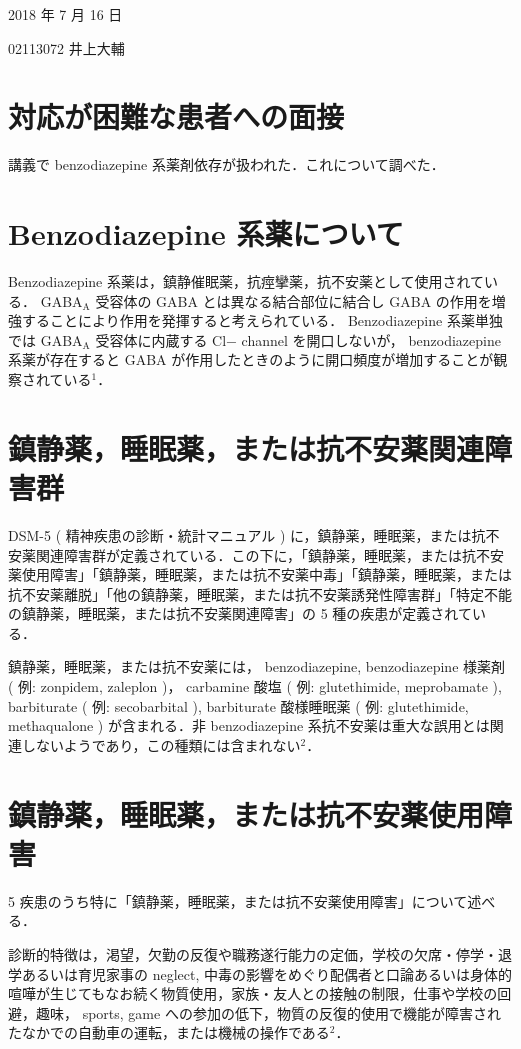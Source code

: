 \documentclass[11pt,dvipdfmx,uplatex]{jsarticle}
\begin{document}
2018 年 7 月 16 日

02113072 井上大輔
\section*{対応が困難な患者への面接}

講義で benzodiazepine 系薬剤依存が扱われた．これについて調べた．

\section{Benzodiazepine 系薬について}

Benzodiazepine 系薬は，鎮静催眠薬，抗痙攣薬，抗不安薬として使用されている． GABA$_\textrm{A}$ 受容体の GABA とは異なる結合部位に結合し GABA の作用を増強することにより作用を発揮すると考えられている． Benzodiazepine 系薬単独では GABA$_\textrm{A}$ 受容体に内蔵する Cl$-$ channel を開口しないが， benzodiazepine 系薬が存在すると GABA が作用したときのように開口頻度が増加することが観察されている$^1$．

\section{鎮静薬，睡眠薬，または抗不安薬関連障害群}

DSM-5 ( 精神疾患の診断・統計マニュアル ) に，鎮静薬，睡眠薬，または抗不安薬関連障害群が定義されている．この下に，「鎮静薬，睡眠薬，または抗不安薬使用障害」「鎮静薬，睡眠薬，または抗不安薬中毒」「鎮静薬，睡眠薬，または抗不安薬離脱」「他の鎮静薬，睡眠薬，または抗不安薬誘発性障害群」「特定不能の鎮静薬，睡眠薬，または抗不安薬関連障害」の 5 種の疾患が定義されている．

鎮静薬，睡眠薬，または抗不安薬には， benzodiazepine, benzodiazepine 様薬剤 ( 例: zonpidem, zaleplon )， carbamine 酸塩 ( 例: glutethimide, meprobamate ), barbiturate ( 例: secobarbital ), barbiturate 酸様睡眠薬 ( 例: glutethimide, methaqualone ) が含まれる．非 benzodiazepine 系抗不安薬は重大な誤用とは関連しないようであり，この種類には含まれない$^2$．

\section{鎮静薬，睡眠薬，または抗不安薬使用障害}

5 疾患のうち特に「鎮静薬，睡眠薬，または抗不安薬使用障害」について述べる．

診断的特徴は，渇望，欠勤の反復や職務遂行能力の定価，学校の欠席・停学・退学あるいは育児家事の neglect, 中毒の影響をめぐり配偶者と口論あるいは身体的喧嘩が生じてもなお続く物質使用，家族・友人との接触の制限，仕事や学校の回避，趣味， sports, game への参加の低下，物質の反復的使用で機能が障害されたなかでの自動車の運転，または機械の操作である$^2$．
\end{document}

